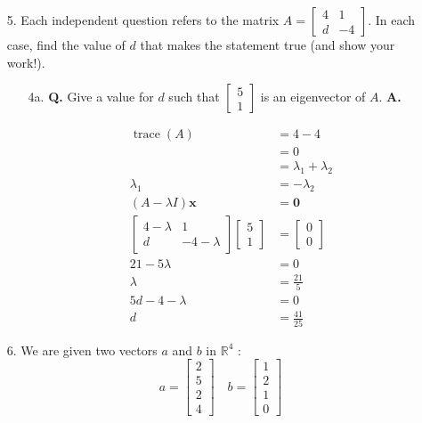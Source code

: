 \documentclass[main.tex]{subfiles}
\begin{document}
\begin{enumerate}
\begin{enumerate}
    \end{enumerate}

\item[5.] Each independent question refers to the matrix $A=\left[\begin{array}{cc}4 & 1 \\ d & -4\end{array}\right]$. In each case, find the value of $d$ that makes the statement true (and show your work!).
\begin{enumerate}
    \item [4a.] \textbf{Q.} Give a value for $d$ such that $\left[\begin{array}{l}5 \\ 1\end{array}\right]$ is an eigenvector of $A$. 
    \textbf{A.}

    $$
    \begin{aligned}
    \operatorname{trace}(A)&=4-4\\
    & =0\\
    & = \lambda_1 + \lambda_2\\
    \lambda_1 &= -\lambda_2\\
    (A-\lambda I)\bm{x} & = \bm{0}\\
    \left[\begin{array}{cc}4-\lambda & 1 \\ d & -4-\lambda\end{array}\right]
    \left[\begin{array}{l}5 \\ 1\end{array}\right] 
    & = \left[\begin{array}{l}0 \\ 0\end{array}\right]\\
    21-5\lambda &= 0\\
    \lambda &= \frac{21}{5}\\
    5d - 4 -\lambda & = 0\\
    d &= \frac{41}{25}
    \end{aligned}
    $$
    
\end{enumerate}

\item[6.] We are given two vectors $a$ and $b$ in $\mathbb{R}^{4}$ :
$$
a=\left[\begin{array}{l}
2 \\
5 \\
2 \\
4
\end{array}\right] \quad b=\left[\begin{array}{l}
1 \\
2 \\
1 \\
0
\end{array}\right]
$$
    \begin{enumerate}
    

\end{enumerate}
\end{enumerate}
\end{document}
